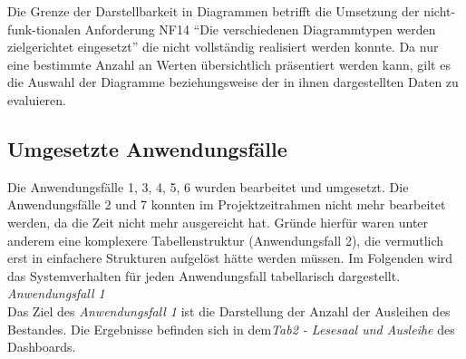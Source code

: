 Die Grenze der Darstellbarkeit in Diagrammen betrifft die Umsetzung der nicht-funk-tionalen Anforderung NF14 \enquote{Die verschiedenen Diagrammtypen werden zielgerichtet eingesetzt}
die nicht vollständig realisiert werden konnte. Da nur eine bestimmte Anzahl an Werten übersichtlich präsentiert werden kann, gilt es die Auswahl der Diagramme
beziehungsweise der in ihnen dargestellten Daten zu evaluieren. 



\subsection{Umgesetzte Anwendungsfälle}
Die Anwendungsfälle 1, 3, 4, 5, 6 wurden bearbeitet und umgesetzt.
Die Anwendungsfälle 2 und 7 konnten im Projektzeitrahmen nicht mehr bearbeitet werden, 
da die Zeit nicht mehr ausgereicht hat. Gründe hierfür waren unter anderem eine komplexere Tabellenstruktur (Anwendungsfall 2),
die vermutlich erst in einfachere Strukturen aufgelöst hätte werden müssen. Im Folgenden wird das Systemverhalten für jeden
Anwendungsfall tabellarisch dargestellt.\\

\clearpage
\noindent
\textit{Anwendungsfall 1}\\
Das Ziel des \textit{Anwendungsfall 1} ist die Darstellung der Anzahl der Ausleihen des Bestandes.
Die Ergebnisse befinden sich in dem\textit{Tab2 - Lesesaal und Ausleihe} des Dashboards.

